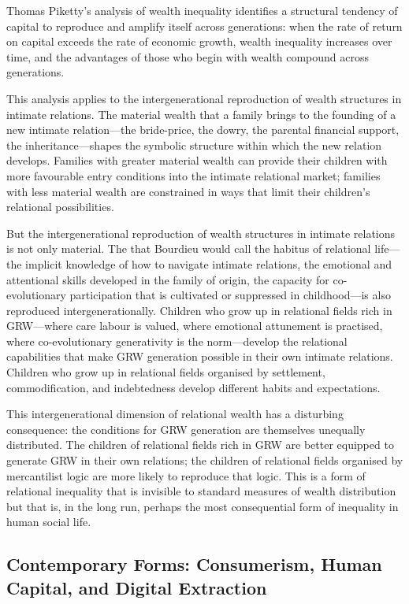 \noindent
Thomas Piketty's analysis of wealth inequality \parencite{piketty2014} identifies a structural tendency of capital to reproduce and amplify itself across generations: when the rate of return on capital exceeds the rate of economic growth, wealth inequality increases over time, and the advantages of those who begin with wealth compound across generations.

This analysis applies to the intergenerational reproduction of wealth structures in intimate relations. The material wealth that a family brings to the founding of a new intimate relation---the bride-price, the dowry, the parental financial support, the inheritance---shapes the symbolic structure within which the new relation develops. Families with greater material wealth can provide their children with more favourable entry conditions into the intimate relational market; families with less material wealth are constrained in ways that limit their children's relational possibilities.

But the intergenerational reproduction of wealth structures in intimate relations is not only material. The  that Bourdieu would call the habitus of relational life---the implicit knowledge of how to navigate intimate relations, the emotional and attentional skills developed in the family of origin, the capacity for co-evolutionary participation that is cultivated or suppressed in childhood---is also reproduced intergenerationally. Children who grow up in relational fields rich in GRW---where care labour is valued, where emotional attunement is practised, where co-evolutionary generativity is the norm---develop the relational capabilities that make GRW generation possible in their own intimate relations. Children who grow up in relational fields organised by settlement, commodification, and indebtedness develop different habits and expectations.

This intergenerational dimension of relational wealth has a disturbing consequence: the conditions for GRW generation are themselves unequally distributed. The children of relational fields rich in GRW are better equipped to generate GRW in their own relations; the children of relational fields organised by mercantilist logic are more likely to reproduce that logic. This is a form of relational inequality that is invisible to standard measures of wealth distribution but that is, in the long run, perhaps the most consequential form of inequality in human social life.

\subsection{Contemporary Forms: Consumerism, Human Capital, and Digital Extraction}
\label{p15:subsec:contemporary}

